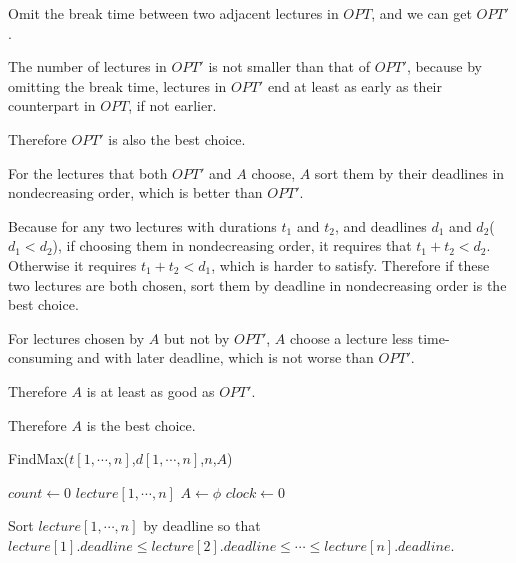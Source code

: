 \documentclass[12pt,a4paper]{article}
\theoremstyle{definition}
\begin{document}
\begin{enumerate}
        Omit the break time between two adjacent lectures in $OPT$, and we can get $OPT'$.
        
        The number of lectures in $OPT'$ is not smaller than that of $OPT'$, because by omitting the break time, lectures in $OPT'$ end at least as early as their counterpart in $OPT$, if not earlier.
        
        Therefore $OPT'$ is also the best choice.
        
        For the lectures that both $OPT'$ and $A$ choose, $A$ sort them by their deadlines in nondecreasing order, which is better than $OPT'$.
        
        Because for any two lectures with durations $t_1$ and $t_2$, and deadlines $d_1$ and $d_2$($d_1<d_2$), if choosing them in nondecreasing order, it requires that $t_1+t_2<d_2$. Otherwise it requires $t_1+t_2<d_1$, which is harder to satisfy. Therefore if these two lectures are both chosen, sort them by deadline in nondecreasing order is the best choice.
        
        For lectures chosen by $A$ but not by $OPT'$, $A$ choose a lecture less time-consuming and with later deadline, which is not worse than $OPT'$.
        
        Therefore $A$ is at least as good as $OPT'$.
        
        Therefore $A$ is the best choice. 
         
        \begin{minipage}[t]{0.90\textwidth}
        	\begin{algorithm}[H]
        		\BlankLine
        		\caption{FindMax($t[1,\cdots,n]$,$d[1,\cdots,n]$,$n$,$A$)}
        		\label{Alg-FindMax}
        		
        		$count \leftarrow 0$\;
        		$lecture[1,\cdots,n]$\;
        		$A\leftarrow \phi$\;
        		$clock\leftarrow 0$\;
        		
        		Sort $lecture[1,\cdots,n]$ by deadline so that $lecture[1].deadline\le lecture[2].deadline\le\cdots\le lecture[n].deadline$.
        		
\end{algorithm}
\end{minipage}
\end{enumerate}
\end{document}
